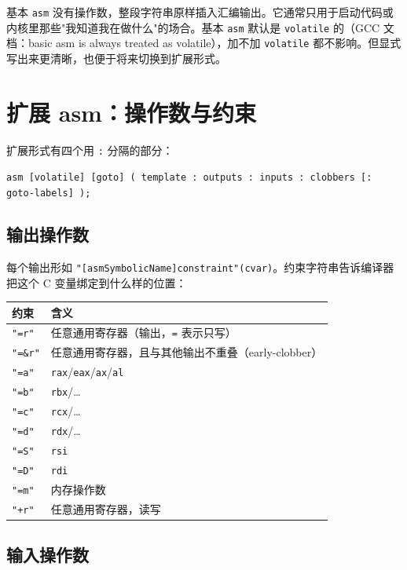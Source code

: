 \documentclass[12pt,a4paper,fontset=fandol]{ctexbook}
\newcommand{\kw}[1]{\texttt{#1}}
\begin{document}
基本 \texttt{asm} 没有操作数，整段字符串原样插入汇编输出。它通常只用于启动代码或内核里那些"我知道我在做什么"的场合。基本 \texttt{asm} 默认是 \kw{volatile} 的（GCC 文档：basic asm is always treated as volatile），加不加 \kw{volatile} 都不影响。但显式写出来更清晰，也便于将来切换到扩展形式。

\section{扩展 asm：操作数与约束}\label{sec:extended-asm}

扩展形式有四个用 \texttt{:} 分隔的部分：

\begin{center}
\texttt{asm [volatile] [goto] ( template : outputs : inputs : clobbers [: goto-labels] );}
\end{center}

\subsection{输出操作数}\label{sec:asm-outputs}

每个输出形如 \texttt{"[asmSymbolicName]constraint"(cvar)}。约束字符串告诉编译器把这个 C 变量绑定到什么样的位置：

\begin{longtable}{p{2.2cm}p{11cm}}
\toprule
\textbf{约束} & \textbf{含义} \\
\midrule
\texttt{"=r"} & 任意通用寄存器（输出，\texttt{=} 表示只写） \\
\texttt{"=\&r"} & 任意通用寄存器，且与其他输出不重叠（early-clobber） \\
\texttt{"=a"} & \texttt{rax}/\allowbreak{}\texttt{eax}/\allowbreak{}\texttt{ax}/\allowbreak{}\texttt{al} \\
\texttt{"=b"} & \texttt{rbx}/\allowbreak{}\ldots \\
\texttt{"=c"} & \texttt{rcx}/\allowbreak{}\ldots \\
\texttt{"=d"} & \texttt{rdx}/\allowbreak{}\ldots \\
\texttt{"=S"} & \texttt{rsi} \\
\texttt{"=D"} & \texttt{rdi} \\
\texttt{"=m"} & 内存操作数 \\
\texttt{"+r"} & 任意通用寄存器，读写 \\
\bottomrule
\end{longtable}

\subsection{输入操作数}\label{sec:asm-inputs}
\end{document}
